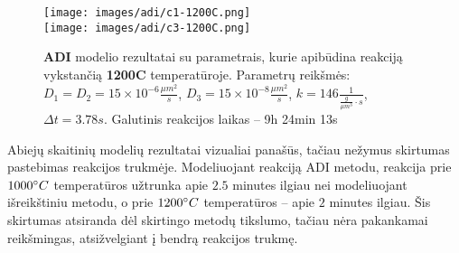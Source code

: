 \begin{figure}[h!]
  \centering
  \texttt{[image: images/adi/c1-1200C.png]} \\ 
  \texttt{[image: images/adi/c3-1200C.png]} 
  \caption{\textbf{ADI} modelio rezultatai su parametrais, kurie apibūdina reakciją vykstančią \textbf{1200\degree C} temperatūroje. Parametrų reikšmės: $D_1 = D_2 = 15\times 10^{-6} \frac{\mu m^2}{s}$, $D_3 = 15\times 10^{-8} \frac{\mu m^2}{s}$, $k = 146 \frac{1}{ \frac{g}{\mu m^3}\cdot s}$, $\Delta t = 3.78s$. Galutinis reakcijos laikas -- 9h 24min 13s}
  \label{fig:adi-result-T-1200}
\end{figure}


Abiejų skaitinių modelių rezultatai vizualiai panašūs, tačiau nežymus skirtumas pastebimas reakcijos trukmėje. Modeliuojant reakciją ADI metodu, reakcija prie $1000\degree C$ temperatūros užtrunka apie $2.5$ minutes ilgiau nei modeliuojant išreikštiniu metodu, o prie $1200\degree C$ temperatūros -- apie $2$ minutes ilgiau. Šis skirtumas atsiranda dėl skirtingo metodų tikslumo, tačiau nėra pakankamai reikšmingas, atsižvelgiant į bendrą reakcijos trukmę.
